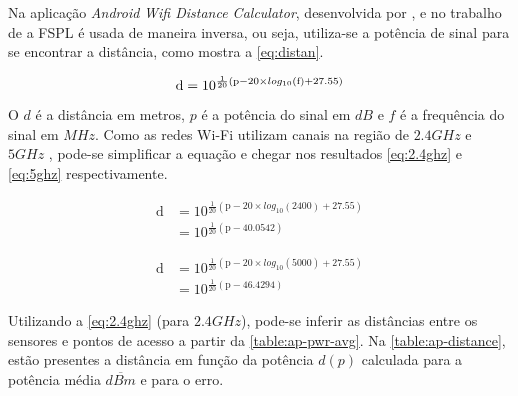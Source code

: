 Na aplicação \emph{Android} \emph{Wifi Distance Calculator}, desenvolvida por
, e no trabalho de  a FSPL é usada
de maneira inversa, ou seja, utiliza-se a potência de sinal para se encontrar a
distância, como mostra a \autoref{eq:distan}.

\begin{equation}
	\text{d} = 10 ^{ \frac{1}{20} \left( \text{p} - 20 \times log_{10}\left(\text{f}\right)  + 27.55 \right) } \label{eq:distan}\\
\end{equation}

O $d$ é a distância em metros, $p$ é a potência do sinal em $dB$ e $f$ é a
frequência do sinal em $MHz$. Como as redes Wi-Fi utilizam canais na região de
$2.4GHz$ e $5GHz$ \cite{ieee80211}, pode-se simplificar a equação e chegar nos
resultados \autoref{eq:2.4ghz} e \autoref{eq:5ghz} respectivamente.

\begin{align}
\text{d}	&= 10 ^{ \frac{1}{20} \left( \text{p} - 20 \times log_{10}\left(\text{2400}\right)  + 27.55 \right) } \nonumber \\
			&= 10 ^{ \frac{1}{20} \left( \text{p} - 40.0542 \right) } \label{eq:2.4ghz}
\end{align}

\begin{align}
\text{d}	&= 10 ^{ \frac{1}{20} \left( \text{p} - 20 \times log_{10}\left(\text{5000}\right)  + 27.55 \right) } \nonumber \\
			&= 10 ^{ \frac{1}{20} \left( \text{p} - 46.4294 \right) } \label{eq:5ghz}
\end{align}

Utilizando a \autoref{eq:2.4ghz} (para $2.4GHz$), pode-se inferir as distâncias
entre os sensores e pontos de acesso a partir da \autoref{table:ap-pwr-avg}. Na
\autoref{table:ap-distance}, estão presentes a distância em função da potência
$d(p)$ calculada para a potência média $\overline{dBm}$ e para o erro.



